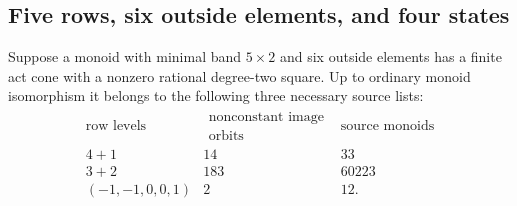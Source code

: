 \subsection{Five rows, six outside elements, and four states}

\begin{lemma}
\label{C:five-row-six-outside-source-census}
Suppose a monoid with minimal band $5\times2$ and six outside
elements has a finite act cone with a nonzero rational degree-two
square. Up to ordinary monoid isomorphism it belongs to the following
three necessary source lists:
\[
\begin{array}{c|r|r}
\text{row levels}&\substack{\text{nonconstant image}\\\text{orbits}}&
 \text{source monoids}\\\hline
4+1&14&33\\
3+2&183&60223\\
(-1,-1,0,0,1)&2&12.
\end{array}
\]
\end{lemma}
